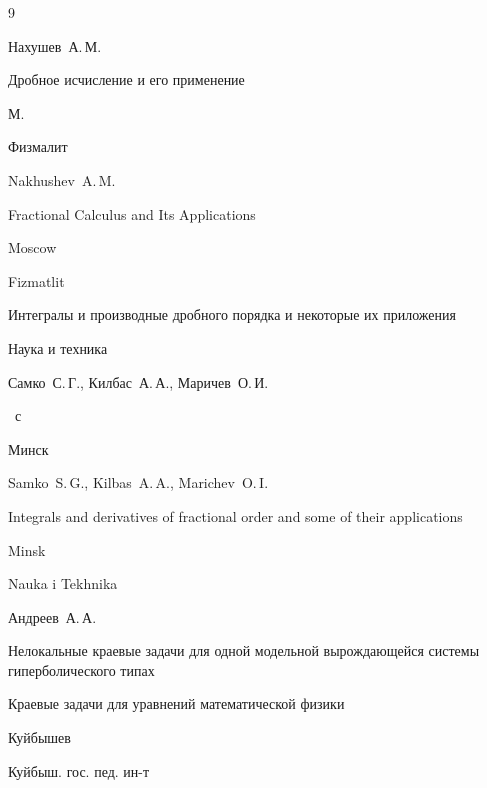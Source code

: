 \begin{thebibliography}{9}




\by Нахушев~А.\,М.

\book Дробное исчисление и его применение

\publaddr М.

\publ Физмалит



\misctransl

\by Nakhushev~A.\,M.

\book Fractional Calculus and Its Applications

\publaddr Moscow

\publ Fizmatlit






  \book Интегралы и производные дробного порядка и некоторые их приложения

  \publ Наука и техника


  \by Самко~С.\,Г., Килбас~А.\,А., Маричев~О.\,И.

  ~с

  \publaddr Минск

\misctransl

\by Samko~S.\,G., Kilbas~A.\,A., Marichev~O.\,I.

\book Integrals and derivatives of fractional order and some of their applications

\publaddr Minsk

\publ Nauka i Tekhnika






\by Андреев~А.\,А.

\paper Нелокальные краевые задачи для одной модельной вырождающейся системы гиперболического типах

\inbook Краевые задачи для уравнений математической физики

\publaddr Куйбышев

\publ Куйбыш. гос. пед. ин-т



\end{thebibliography}
